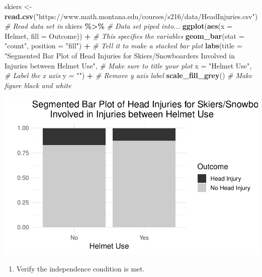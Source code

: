 \documentclass[
]{report}
\newenvironment{Shaded}{\begin{snugshade}}{\end{snugshade}}
\newcommand{\AttributeTok}[1]{\textcolor[rgb]{0.13,0.29,0.53}{#1}}
\newcommand{\CommentTok}[1]{\textcolor[rgb]{0.56,0.35,0.01}{\textit{#1}}}
\newcommand{\FunctionTok}[1]{\textcolor[rgb]{0.13,0.29,0.53}{\textbf{#1}}}
\newcommand{\NormalTok}[1]{#1}
\newcommand{\OtherTok}[1]{\textcolor[rgb]{0.56,0.35,0.01}{#1}}
\newcommand{\SpecialCharTok}[1]{\textcolor[rgb]{0.81,0.36,0.00}{\textbf{#1}}}
\newcommand{\StringTok}[1]{\textcolor[rgb]{0.31,0.60,0.02}{#1}}
\providecommand{\tightlist}{%
  \setlength{\itemsep}{0pt}\setlength{\parskip}{0pt}}
\begin{document}
\begin{Shaded}
\begin{Highlighting}[]
\NormalTok{skiers }\OtherTok{\textless{}{-}} \FunctionTok{read.csv}\NormalTok{(}\StringTok{"https://www.math.montana.edu/courses/s216/data/HeadInjuries.csv"}\NormalTok{) }\CommentTok{\# Read data set in}
\NormalTok{skiers }\SpecialCharTok{\%\textgreater{}\%} \CommentTok{\# Data set piped into...}
  \FunctionTok{ggplot}\NormalTok{(}\FunctionTok{aes}\NormalTok{(}\AttributeTok{x =}\NormalTok{ Helmet, }\AttributeTok{fill =}\NormalTok{ Outcome)) }\SpecialCharTok{+}   \CommentTok{\# This specifies the variables}
  \FunctionTok{geom\_bar}\NormalTok{(}\AttributeTok{stat =} \StringTok{"count"}\NormalTok{, }\AttributeTok{position =} \StringTok{"fill"}\NormalTok{) }\SpecialCharTok{+}  \CommentTok{\# Tell it to make a stacked bar plot}
  \FunctionTok{labs}\NormalTok{(}\AttributeTok{title =} \StringTok{"Segmented Bar Plot of Head Injuries for Skiers/Snowboarders}
\StringTok{       Involved in Injuries between Helmet Use"}\NormalTok{,  }\CommentTok{\# Make sure to title your plot}
       \AttributeTok{x =} \StringTok{"Helmet Use"}\NormalTok{,   }\CommentTok{\# Label the x axis}
       \AttributeTok{y =} \StringTok{""}\NormalTok{) }\SpecialCharTok{+}  \CommentTok{\# Remove y axis label}
  \FunctionTok{scale\_fill\_grey}\NormalTok{()  }\CommentTok{\# Make figure black and white}
\end{Highlighting}
\end{Shaded}

\begin{center}\includegraphics[width=0.6\linewidth]{09-A19-inference-2cat-theory_files/figure-latex/unnamed-chunk-1-1} \end{center}

\begin{enumerate}
\def\labelenumi{\arabic{enumi}.}
\tightlist
\item
  Verify the independence condition is met.
\end{enumerate}
\end{document}
